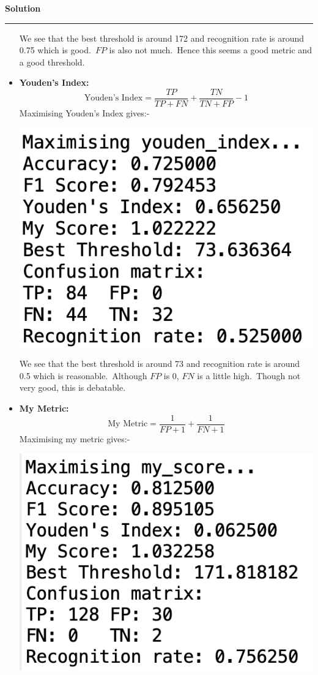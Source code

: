 \documentclass[a4paper,12pt]{article}
\newenvironment{solution}[2][]{%
    \begin{mdframed}[linecolor=blue!70!black, linewidth=2pt, roundcorner=10pt, backgroundcolor=yellow!10!white, skipabove=12pt, skipbelow=12pt]%
        \textbf{\large #2}
        \par\noindent\rule{\textwidth}{0.4pt}
}{
    \end{mdframed}
}
\begin{document}
\begin{solution}{Solution}
\begin{itemize}
\begin{center}
		\end{center}
		We see that the best threshold is around 172 and recognition rate is around 0.75 which is good.\ $FP$ is also not much.\ Hence this seems a good metric and a good threshold.
		\item \textbf{Youden's Index:}
		\[
			\text{Youden's Index} = \frac{TP}{TP+FN} + \frac{TN}{TN+FP} - 1
		\]
		Maximising Youden's Index gives:-
		\begin{center}
			\includegraphics[scale=0.5]{../images/youden_index.png}
		\end{center}
		We see that the best threshold is around 73 and recognition rate is around 0.5 which is reasonable.\ Although $FP$ is 0, $FN$ is a little high.\ Though not very good, this is debatable.
		\item \textbf{My Metric:}
		\[
			\text{My Metric} = \frac{1}{FP+1} + \frac{1}{FN+1}
		\]
		Maximising my metric gives:-
		\begin{center}
			\includegraphics[scale=0.5]{../images/my-metric.png}

\end{center}
\end{itemize}
\end{solution}
\end{document}
